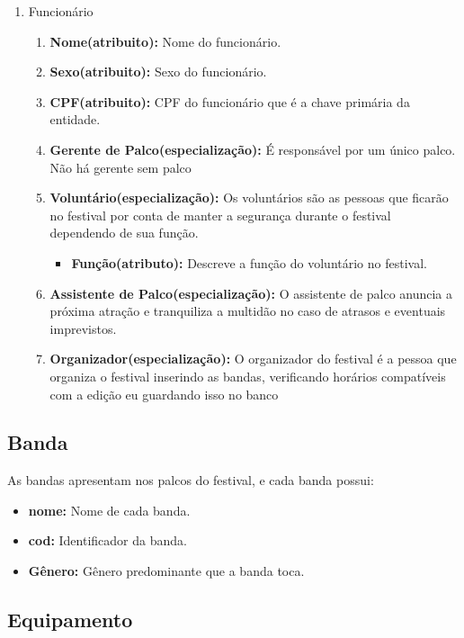\documentclass[12pt]{article}
\begin{document}
	\begin{enumerate}
		\item Funcionário
		\begin{enumerate}
			\item \textbf{Nome(atribuito):} Nome do funcionário.
			\item \textbf{Sexo(atribuito):} Sexo do funcionário.
			\item \textbf{CPF(atribuito):}  CPF do funcionário que é a chave primária da entidade.
			\item \textbf{Gerente de Palco(especialização):} É responsável por um único palco. Não há gerente sem palco
			\item \textbf{Voluntário(especialização):} Os voluntários são as pessoas que ficarão no festival por conta de manter a segurança durante o festival dependendo de sua função.
				\begin{itemize}
					\item \textbf{Função(atributo):} Descreve a função do voluntário no festival.
				\end{itemize}
			\item \textbf{Assistente de Palco(especialização):} O assistente de palco anuncia a próxima atração e tranquiliza a multidão no caso de atrasos e eventuais imprevistos.
			\item \textbf{Organizador(especialização):} O organizador do festival é a pessoa que organiza o festival inserindo as bandas, verificando horários compatíveis com a edição eu guardando isso no banco
		\end{enumerate}
	\end{enumerate}


\subsection{Banda}

As bandas apresentam nos palcos do festival, e cada banda possui:
\begin{itemize}
\item \textbf{nome:} Nome de cada banda.
\item \textbf{cod:} Identificador da banda.
\item \textbf{Gênero:} Gênero predominante que a banda toca.
\end{itemize}

\subsection{Equipamento}
\end{document}
